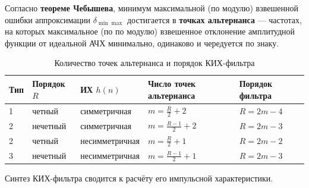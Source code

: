 \documentclass[a4paper, 14pt]{extarticle}
\begin{document}
Согласно \textbf{теореме Чебышева}, минимум максимальной (по модулю) взвешенной ошибки аппроксимации $\delta_{\min\max}$ достигается в \textbf{точках альтернанса} --- частотах, на которых максимальное (по по модулю) взвешенное отклонение амплитудной функции от идеальной АЧХ минимально, одинаково и чередуется по знаку.

\begin{table}[h]
\centering
\caption{Количество точек альтернанса и порядок КИХ-фильтра}
\begin{tabular}{@{}lllll@{}}
\toprule
\textbf{Тип} & \textbf{Порядок $R$} & \textbf{ИХ $h(n)$} & \textbf{Число точек альтернанса} & \textbf{Порядок фильтра} \\ \midrule
1            & четный               & симметричная       & $m=\frac{R}{2} + 2$             & $R=2m-4$                 \\
2            & нечетный             & симметричная       & $m=\frac{R-1}{2} + 2$            & $R=2m-3$                 \\
2            & четный               & несимметричная     & $m=\frac{R}{2} + 1$             & $R=2m-2$                 \\
3            & нечетный             & несимметричная     & $m=\frac{R-1}{2} + 1$           & $R=2m-3$                 \\ \bottomrule
\end{tabular}
\end{table}

Синтез КИХ-фильтра сводится к расчёту его импульсной характеристики.
\end{document}
